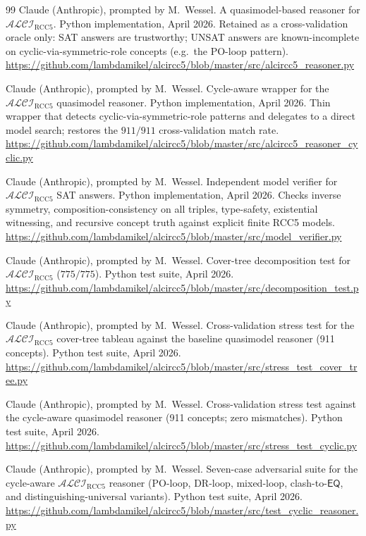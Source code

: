 \documentclass[11pt]{article}
\newcommand{\ALCIRCC}[1]{\mathcal{ALCI}_{\mathrm{RCC#1}}}
\newcommand{\EQ}{\mathsf{EQ}}
\theoremstyle{plain}
\theoremstyle{definition}
\begin{document}
\begin{thebibliography}{99}
Claude (Anthropic), prompted by M.\ Wessel.
\newblock A quasimodel-based reasoner for $\ALCIRCC{5}$.
\newblock Python implementation, April 2026.
\newblock Retained as a cross-validation oracle only: SAT answers
  are trustworthy; UNSAT answers are known-incomplete on
  cyclic-via-symmetric-role concepts (e.g.\ the PO-loop pattern).
\newblock \url{https://github.com/lambdamikel/alcircc5/blob/master/src/alcircc5_reasoner.py}

Claude (Anthropic), prompted by M.\ Wessel.
\newblock Cycle-aware wrapper for the $\ALCIRCC{5}$ quasimodel
  reasoner.
\newblock Python implementation, April 2026.
\newblock Thin wrapper that detects cyclic-via-symmetric-role
  patterns and delegates to a direct model search; restores the
  $911/911$ cross-validation match rate.
\newblock \url{https://github.com/lambdamikel/alcircc5/blob/master/src/alcircc5_reasoner_cyclic.py}

Claude (Anthropic), prompted by M.\ Wessel.
\newblock Independent model verifier for $\ALCIRCC{5}$ SAT answers.
\newblock Python implementation, April 2026.
\newblock Checks inverse symmetry, composition-consistency on all
  triples, type-safety, existential witnessing, and recursive
  concept truth against explicit finite RCC5 models.
\newblock \url{https://github.com/lambdamikel/alcircc5/blob/master/src/model_verifier.py}

Claude (Anthropic), prompted by M.\ Wessel.
\newblock Cover-tree decomposition test for $\ALCIRCC{5}$
  ($775/775$).
\newblock Python test suite, April 2026.
\newblock \url{https://github.com/lambdamikel/alcircc5/blob/master/src/decomposition_test.py}

Claude (Anthropic), prompted by M.\ Wessel.
\newblock Cross-validation stress test for the $\ALCIRCC{5}$
  cover-tree tableau against the baseline quasimodel reasoner
  (911 concepts).
\newblock Python test suite, April 2026.
\newblock \url{https://github.com/lambdamikel/alcircc5/blob/master/src/stress_test_cover_tree.py}

Claude (Anthropic), prompted by M.\ Wessel.
\newblock Cross-validation stress test against the cycle-aware
  quasimodel reasoner (911 concepts; zero mismatches).
\newblock Python test suite, April 2026.
\newblock \url{https://github.com/lambdamikel/alcircc5/blob/master/src/stress_test_cyclic.py}

Claude (Anthropic), prompted by M.\ Wessel.
\newblock Seven-case adversarial suite for the cycle-aware
  $\ALCIRCC{5}$ reasoner (PO-loop, DR-loop, mixed-loop,
  clash-to-$\EQ$, and distinguishing-universal variants).
\newblock Python test suite, April 2026.
\newblock \url{https://github.com/lambdamikel/alcircc5/blob/master/src/test_cyclic_reasoner.py}


\end{thebibliography}
\end{document}
